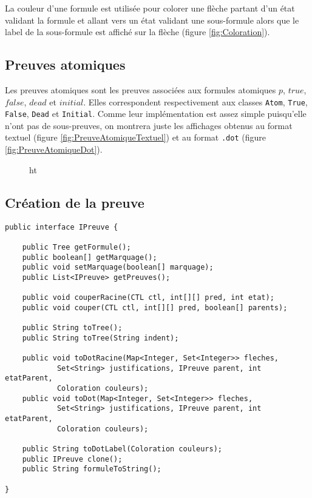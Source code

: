 \documentclass[dvipsnames]{report}
\begin{document}
La couleur d'une formule est utilisée pour colorer une flèche partant d'un état validant la formule et allant vers un état validant une sous-formule alors que le label de la sous-formule est affiché sur la flèche (figure \ref{fig:Coloration}).



\subsection{Preuves atomiques}

Les preuves atomiques sont les preuves associées aux formules atomiques $p$, $true$, $false$, $dead$ et $initial$. Elles correspondent respectivement aux classes \texttt{Atom}, \texttt{True}, \texttt{False}, \texttt{Dead} et \texttt{Initial}. Comme leur implémentation est assez simple puisqu'elle n'ont pas de sous-preuves, on montrera juste les affichages obtenus au format textuel (figure \ref{fig:PreuveAtomiqueTextuel}) et au format \texttt{.dot} (figure \ref{fig:PreuveAtomiqueDot}).

\begin{figure}{ht}

\end{figure}

\subsection{Création de la preuve}

\newpage

\begin{lstlisting}[caption={Interface \psverb+IPreuve+ commune à toutes les preuves}, label={lst:IPreuve}]
public interface IPreuve {

	public Tree getFormule();
	public boolean[] getMarquage();
	public void setMarquage(boolean[] marquage);
	public List<IPreuve> getPreuves();

	public void couperRacine(CTL ctl, int[][] pred, int etat);
	public void couper(CTL ctl, int[][] pred, boolean[] parents);

	public String toTree();
	public String toTree(String indent);

	public void toDotRacine(Map<Integer, Set<Integer>> fleches,
			Set<String> justifications, IPreuve parent, int etatParent,
			Coloration couleurs);
	public void toDot(Map<Integer, Set<Integer>> fleches,
			Set<String> justifications, IPreuve parent, int etatParent,
			Coloration couleurs);

	public String toDotLabel(Coloration couleurs);
	public IPreuve clone();
	public String formuleToString();

}
\end{lstlisting}
\end{document}
